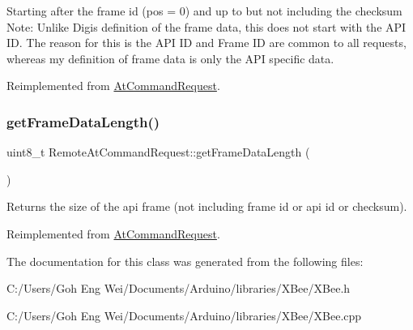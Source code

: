 Starting after the frame id (pos = 0) and up to but not including the checksum Note\+: Unlike Digi\textquotesingle{}s definition of the frame data, this does not start with the A\+PI ID. The reason for this is the A\+PI ID and Frame ID are common to all requests, whereas my definition of frame data is only the A\+PI specific data. 

Reimplemented from \hyperlink{class_at_command_request_aa4fc8f0c8404172cd5532f3d8e5564f2}{At\+Command\+Request}.

\hypertarget{class_remote_at_command_request_a1d78334a8924b0a0e06de6ef3a09c24f}{}\label{class_remote_at_command_request_a1d78334a8924b0a0e06de6ef3a09c24f} 
\subsubsection{\texorpdfstring{get\+Frame\+Data\+Length()}{getFrameDataLength()}}
{\footnotesize\ttfamily uint8\+\_\+t Remote\+At\+Command\+Request\+::get\+Frame\+Data\+Length (\begin{DoxyParamCaption}{ }\end{DoxyParamCaption})\hspace{0.3cm}{\ttfamily [virtual]}}

Returns the size of the api frame (not including frame id or api id or checksum). 

Reimplemented from \hyperlink{class_at_command_request_aad12b8357e63fca9e95b6731a4bfda0d}{At\+Command\+Request}.



The documentation for this class was generated from the following files\+:\begin{DoxyCompactItemize}
\item 
C\+:/\+Users/\+Goh Eng Wei/\+Documents/\+Arduino/libraries/\+X\+Bee/X\+Bee.\+h\item 
C\+:/\+Users/\+Goh Eng Wei/\+Documents/\+Arduino/libraries/\+X\+Bee/X\+Bee.\+cpp\end{DoxyCompactItemize}
